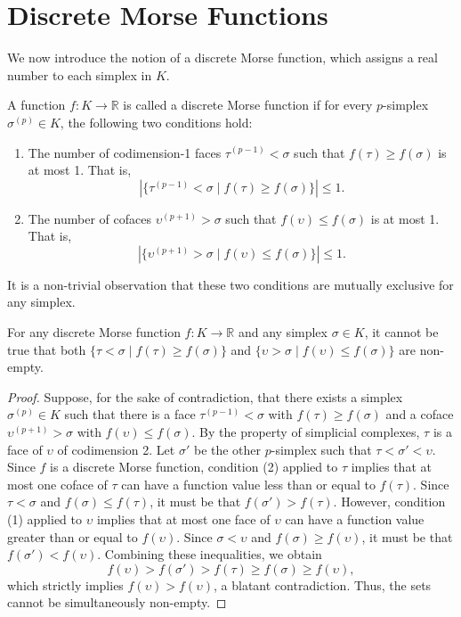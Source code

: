 \section{Discrete Morse Functions}

We now introduce the notion of a discrete Morse function, which assigns a real number to each simplex in $K$.

\begin{definition}
\label{def:discrete_morse_function}
A function $f : K \to \mathbb{R}$ is called a discrete Morse function if for every $p$-simplex $\sigma^{(p)} \in K$, the following two conditions hold:
\begin{enumerate}
    \item The number of codimension-1 faces $\tau^{(p-1)} < \sigma$ such that $f(\tau) \ge f(\sigma)$ is at most 1. That is,
    \[ | \{ \tau^{(p-1)} < \sigma \mid f(\tau) \ge f(\sigma) \} | \le 1. \]
    \item The number of cofaces $\upsilon^{(p+1)} > \sigma$ such that $f(\upsilon) \le f(\sigma)$ is at most 1. That is,
    \[ | \{ \upsilon^{(p+1)} > \sigma \mid f(\upsilon) \le f(\sigma) \} | \le 1. \]
\end{enumerate}
\end{definition}

It is a non-trivial observation that these two conditions are mutually exclusive for any simplex.

\begin{lemma}
\label{lem:mutually_exclusive}
For any discrete Morse function $f : K \to \mathbb{R}$ and any simplex $\sigma \in K$, it cannot be true that both $\{ \tau < \sigma \mid f(\tau) \ge f(\sigma) \}$ and $\{ \upsilon > \sigma \mid f(\upsilon) \le f(\sigma) \}$ are non-empty.
\end{lemma}

\begin{proof}
Suppose, for the sake of contradiction, that there exists a simplex $\sigma^{(p)} \in K$ such that there is a face $\tau^{(p-1)} < \sigma$ with $f(\tau) \ge f(\sigma)$ and a coface $\upsilon^{(p+1)} > \sigma$ with $f(\upsilon) \le f(\sigma)$.
By the property of simplicial complexes, $\tau$ is a face of $\upsilon$ of codimension 2. Let $\sigma'$ be the other $p$-simplex such that $\tau < \sigma' < \upsilon$. 
Since $f$ is a discrete Morse function, condition (2) applied to $\tau$ implies that at most one coface of $\tau$ can have a function value less than or equal to $f(\tau)$. Since $\tau < \sigma$ and $f(\sigma) \le f(\tau)$, it must be that $f(\sigma') > f(\tau)$.
However, condition (1) applied to $\upsilon$ implies that at most one face of $\upsilon$ can have a function value greater than or equal to $f(\upsilon)$. Since $\sigma < \upsilon$ and $f(\sigma) \ge f(\upsilon)$, it must be that $f(\sigma') < f(\upsilon)$.
Combining these inequalities, we obtain 
\[ f(\upsilon) > f(\sigma') > f(\tau) \ge f(\sigma) \ge f(\upsilon), \]
which strictly implies $f(\upsilon) > f(\upsilon)$, a blatant contradiction. Thus, the sets cannot be simultaneously non-empty.
\end{proof}

